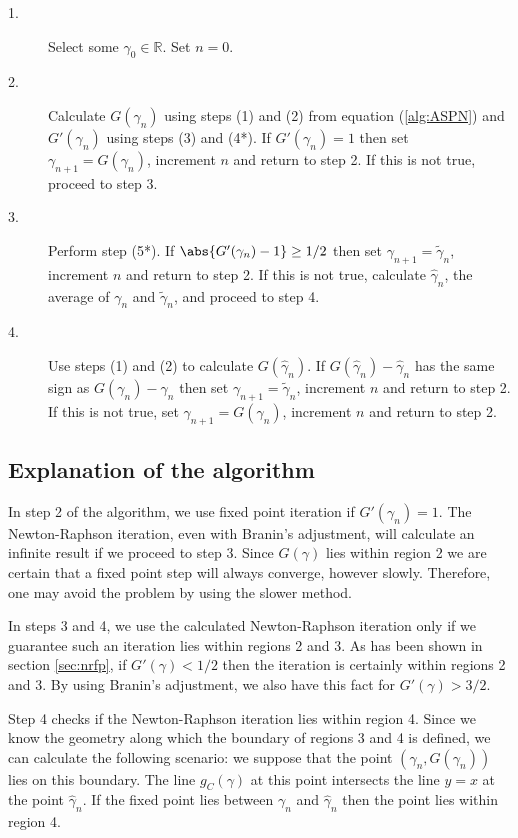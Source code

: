 \documentclass{article}
\begin{document}
\begin{description}
\item[1.] Select some $\gamma_0 \in \mathbb{R}$. Set $n=0$.
\item[2.] Calculate $G(\gamma_n)$ using steps (1) and (2) from equation (\ref{alg:ASPN}) and $G'(\gamma_n)$ using steps (3) and (4*).
If $G'(\gamma_n) = 1$ then set $\gamma_{n+1} = G(\gamma_n)$, increment $n$ and return to step 2.
If this is not true, proceed to step 3.
\item[3.] Perform step (5*).
If $\abs{G'(\gamma_n) - 1} \geq 1/2$ then set $\gamma_{n+1} = \tilde{\gamma}_n$, increment $n$ and return to step 2.
If this is not true, calculate $\hat{\gamma}_n$, the average of $\gamma_n$ and $\tilde{\gamma}_n$, and proceed to step 4.
\item[4.] Use steps (1) and (2) to calculate $G(\hat{\gamma}_n)$.
If $G(\hat{\gamma}_n)-\hat{\gamma}_n$ has the same sign as $G(\gamma_n) - \gamma_n$ then set $\gamma_{n+1} = \tilde{\gamma}_n$, increment $n$ and return to step 2.
If this is not true, set $\gamma_{n+1} = G(\gamma_n)$, increment $n$ and return to step 2.
\end{description}

\subsection{Explanation of the algorithm}

In step 2 of the algorithm, we use fixed point iteration if $G'(\gamma_n) = 1$.
The Newton-Raphson iteration, even with Branin's adjustment, will calculate an infinite result if we proceed to step 3.
Since $G(\gamma)$ lies within region 2 we are certain that a fixed point step will always converge, however slowly.
Therefore, one may avoid the problem by using the slower method.

In steps 3 and 4, we use the calculated Newton-Raphson iteration only if we guarantee such an iteration lies within regions 2 and 3.
As has been shown in section \ref{sec:nrfp}, if $G'(\gamma) < 1/2$ then the iteration is certainly within regions 2 and 3.
By using Branin's adjustment, we also have this fact for $G'(\gamma) > 3/2$.

Step 4 checks if the Newton-Raphson iteration lies within region 4.
Since we know the geometry along which the boundary of regions 3 and 4 is defined, we can calculate the following scenario:
we suppose that the point $(\gamma_n, G(\gamma_n))$ lies on this boundary.
The line $g_C(\gamma)$ at this point intersects the line $y=x$ at the point $\hat{\gamma}_n$.
If the fixed point lies between $\gamma_n$ and $\hat{\gamma}_n$ then the point lies within region 4.
\end{document}
